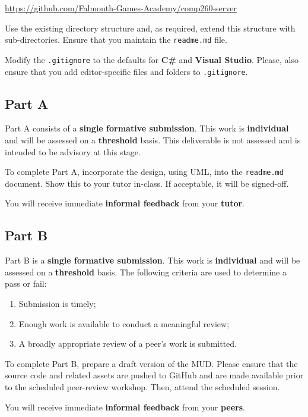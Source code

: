 \documentclass{../../../fal_assignment}
\begin{document}
\indent \url{https://github.com/Falmouth-Games-Academy/comp260-server}

Use the existing directory structure and, as required, extend this structure with sub-directories. Ensure that you maintain the \texttt{readme.md} file.

Modify the \texttt{.gitignore} to the defaults for \textbf{C\#} and \textbf{Visual Studio}. Please, also ensure that you add editor-specific files and folders to \texttt{.gitignore}. 

\subsection*{Part A}

Part A consists of a \textbf{single formative submission}. This work is \textbf{individual} and will be assessed on a \textbf{threshold} basis. This deliverable is not assessed and is intended to be advisory at this stage.

To complete Part A, incorporate the design, using UML, into the \texttt{readme.md} document.  Show this to your tutor in-class.  If acceptable, it will be signed-off. 

You will receive immediate \textbf{informal feedback} from your \textbf{tutor}.

\subsection*{Part B}

Part B is a \textbf{single formative submission}. This work is \textbf{individual} and will be assessed on a \textbf{threshold} basis. The following criteria are used to determine a pass or fail:

\begin{enumerate}[label=(\alph*)]
	\item Submission is timely;
	\item Enough work is available to conduct a meaningful review;
	\item A broadly appropriate review of a peer's work is submitted.
\end{enumerate}

To complete Part B, prepare a draft version of the MUD. Please ensure that the source code and related assets are pushed to GitHub and are made available prior to the scheduled peer-review workshop. Then, attend the scheduled session.

You will receive immediate \textbf{informal feedback} from your \textbf{peers}.
\end{document}
